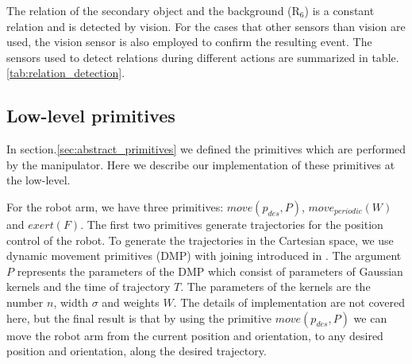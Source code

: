 The relation of the secondary object and the background ($\text{R}_6$) is a constant relation and is detected by vision.
For the cases that other sensors than vision are used, the vision sensor is also employed to confirm the resulting event.
The sensors used to detect relations during different actions are summarized in table.\ref{tab:relation_detection}.


\subsection{Low-level primitives}
\label{section_primitives}
In section.\ref{sec:abstract_primitives} we defined the primitives which are performed by the manipulator.
Here we describe our implementation of these primitives at the low-level.

For the robot arm, we have three primitives: $move(p_{des},P)$, $move_{periodic}(W)$ and $exert(F)$.
The first two primitives generate trajectories for the position control of the robot.
To generate the trajectories in the Cartesian space, we use dynamic movement primitives (DMP) with joining introduced in \cite{Kulvicius2012}.
The argument $P$ represents the parameters of the DMP which consist of parameters of Gaussian kernels and the time of trajectory $T$.
The parameters of the kernels are the number $n$, width $\sigma$ and weights $W$.
The details of implementation are not covered here, but the final result is that by using the primitive $move(p_{des},P)$
we can move the robot arm from the current position and orientation, to any desired position and orientation, along the desired trajectory.

